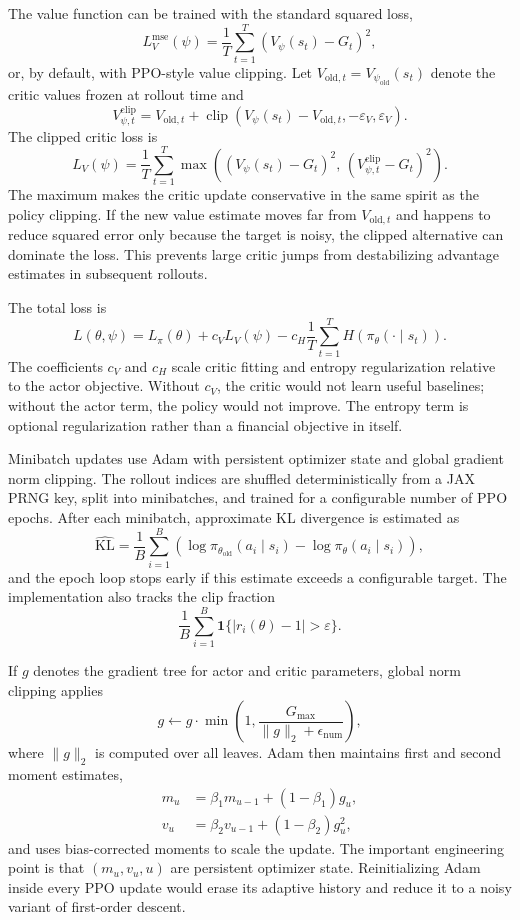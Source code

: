 \documentclass[11pt]{article}
\newcommand{\1}{\mathbf{1}}
\begin{document}
The value function can be trained with the standard squared loss,
\[
L^{\mathrm{mse}}_V(\psi)=
\frac{1}{T}\sum_{t=1}^{T}(V_\psi(s_t)-G_t)^2,
\]
or, by default, with PPO-style value clipping. Let
$V_{\mathrm{old},t}=V_{\psi_{\mathrm{old}}}(s_t)$ denote the critic values
frozen at rollout time and
\[
V^{\mathrm{clip}}_{\psi,t}
= V_{\mathrm{old},t}
+\operatorname{clip}(V_\psi(s_t)-V_{\mathrm{old},t},
-\varepsilon_V,\varepsilon_V).
\]
The clipped critic loss is
\[
L_V(\psi)=\frac{1}{T}\sum_{t=1}^{T}
\max\left(
(V_\psi(s_t)-G_t)^2,\,
(V^{\mathrm{clip}}_{\psi,t}-G_t)^2
\right).
\]
The maximum makes the critic update conservative in the same spirit as the
policy clipping. If the new value estimate moves far from
$V_{\mathrm{old},t}$ and happens to reduce squared error only because the
target is noisy, the clipped alternative can dominate the loss. This prevents
large critic jumps from destabilizing advantage estimates in subsequent
rollouts.

The total loss is
\[
L(\theta,\psi)
= L_\pi(\theta)+c_VL_V(\psi)-c_H\frac{1}{T}\sum_{t=1}^{T}H(\pi_\theta(\cdot\mid s_t)).
\]
The coefficients $c_V$ and $c_H$ scale critic fitting and entropy
regularization relative to the actor objective. Without $c_V$, the critic would
not learn useful baselines; without the actor term, the policy would not
improve. The entropy term is optional regularization rather than a financial
objective in itself.

Minibatch updates use Adam with persistent optimizer state and global gradient
norm clipping. The rollout indices are shuffled deterministically from a JAX
PRNG key, split into minibatches, and trained for a configurable number of PPO
epochs. After each minibatch, approximate KL divergence is estimated as
\[
\widehat{\mathrm{KL}}
=\frac{1}{B}\sum_{i=1}^{B}
\left(\log\pi_{\theta_{\mathrm{old}}}(a_i\mid s_i)
-\log\pi_\theta(a_i\mid s_i)\right),
\]
and the epoch loop stops early if this estimate exceeds a configurable target.
The implementation also tracks the clip fraction
\[
\frac{1}{B}\sum_{i=1}^{B}
\mathbf{1}\{|r_i(\theta)-1|>\varepsilon\}.
\]

If $g$ denotes the gradient tree for actor and critic parameters, global norm
clipping applies
\[
g \leftarrow g\cdot
\min\left(1,\frac{G_{\max}}{\|g\|_2+\epsilon_{\mathrm{num}}}\right),
\]
where $\|g\|_2$ is computed over all leaves. Adam then maintains first and
second moment estimates,
\begin{align}
m_u &= \beta_1m_{u-1}+(1-\beta_1)g_u,\\
v_u &= \beta_2v_{u-1}+(1-\beta_2)g_u^2,
\end{align}
and uses bias-corrected moments to scale the update. The important engineering
point is that $(m_u,v_u,u)$ are persistent optimizer state. Reinitializing Adam
inside every PPO update would erase its adaptive history and reduce it to a
noisy variant of first-order descent.
\end{document}
